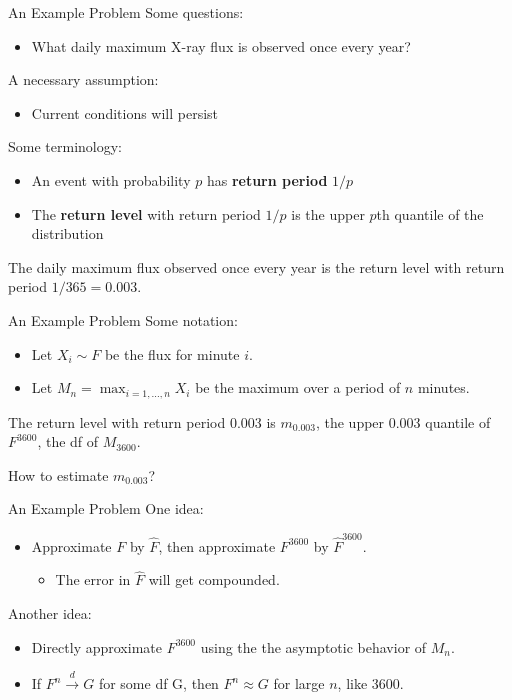 \documentclass{beamer}
\begin{document}
\begin{frame}{An Example Problem}
    Some questions:
    \begin{itemize}
        \item What daily maximum X-ray flux is observed once every year?
    \end{itemize}

    A necessary assumption:
    \begin{itemize}
        \item Current conditions will persist
    \end{itemize}

    \bigskip
    
    Some terminology:
    \begin{itemize}
        \item An event with probability $p$ has \textbf{return period} $1 / p$
        \item The \textbf{return level} with return period $1 / p$ is the upper $p$th quantile of the distribution
    \end{itemize}
    The daily maximum flux observed once every year is the return level with return period $1 / 365 = 0.003$.
\end{frame}

\begin{frame}{An Example Problem}
    Some notation:
    \begin{itemize}
        \item Let $X_i \sim F$ be the flux for minute $i$.
        \item Let $M_n = \max_{i = 1, \ldots, n} X_i$ be the maximum over a period of $n$ minutes.
    \end{itemize}
    The return level with return period $0.003$ is $m_{0.003}$, the upper 0.003 quantile of $F^{3600}$, the df of $M_{3600}$.

    \bigskip

    How to estimate $m_{0.003}$?
\end{frame}

\begin{frame}{An Example Problem}
    One idea:
    \begin{itemize}
        \item Approximate $F$ by $\hat{F}$, then approximate $F^{3600}$ by $\hat{F}^{3600}$.
        \begin{itemize}
            \item The error in $\hat{F}$ will get compounded.
        \end{itemize}
    \end{itemize}

    Another idea:
    \begin{itemize}
        \item Directly approximate $F^{3600}$ using the the asymptotic behavior of $M_n$.
        \item If $F^n \xrightarrow{d} G$ for some df G, then $F^n \approx G$ for large $n$, like 3600.
    \end{itemize}
\end{frame}
\end{document}
